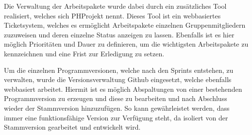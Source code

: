 Die Verwaltung der Arbeitspakete wurde dabei durch ein zusätzliches Tool
realisiert, welches sich PHProjekt nennt. Dieses Tool ist ein webbasiertes
Ticketsystem, welches es ermöglicht Arbeitspakete einzelnen Gruppenmitgliedern
zuzuweisen und deren einzelne Status anzeigen zu lassen. Ebenfalls ist es hier
möglich Prioritäten und Dauer zu definieren, um die wichtigsten Arbeitspakete
zu kennzeichnen und eine Frist zur Erledigung zu setzen.

Um die einzelnen Programmversionen, welche nach den Sprints entstehen, zu
verwalten, wurde die Versionsverwaltung Github eingesetzt, welche ebenfalls
webbasiert arbeitet. Hiermit ist es möglich Abspaltungen von einer bestehenden
Programmversion zu erzeugen und diese zu bearbeiten und nach Abschluss wieder
der Stammversion hinzuzufügen. So kann gewährleistet werden, dass immer eine
funktionsfähige Version zur Verfügung steht, da isoliert von der Stammversion
gearbeitet und entwickelt wird.